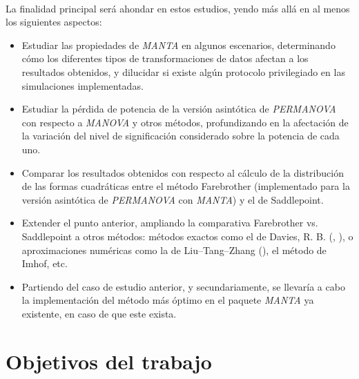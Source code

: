 \documentclass[IB,BIB]{TFUOC}%
\begin{document}
\

La finalidad principal será ahondar en estos estudios, yendo más allá en al menos los siguientes aspectos:


\begin{itemize}
    \item Estudiar las propiedades de \textit{MANTA} en algunos escenarios, determinando cómo los diferentes tipos de transformaciones de datos afectan a los resultados obtenidos, y dilucidar si existe algún protocolo privilegiado en las simulaciones implementadas.
    \item Estudiar la pérdida de potencia de la versión asintótica de \textit{PERMANOVA} con respecto a \textit{MANOVA} y otros métodos, profundizando en la afectación de la variación del nivel de significación considerado sobre la potencia de cada uno.
    \item Comparar los resultados obtenidos con respecto al cálculo de la distribución de las formas cuadráticas entre el método Farebrother (implementado para la versión asintótica de \textit{PERMANOVA} con \textit{MANTA}) y el de Saddlepoint.
    \item Extender el punto anterior, ampliando la comparativa Farebrother vs. Saddlepoint a otros métodos: métodos exactos como el de Davies, R. B. (\cite{davies_numerical_1973}, \cite{davies_algorithm_1980}), o aproximaciones numéricas como la de Liu–Tang–Zhang (\cite{qi_genetic_2022}), el método de Imhof, etc.
    \item Partiendo del caso de estudio anterior, y secundariamente, se llevaría a cabo la implementación del método más óptimo en el paquete \textit{MANTA} ya existente, en caso de que este exista.
\end{itemize}


\section{Objetivos del trabajo}
\label{sec:Objetivos del trabajo}



%
\end{document}
